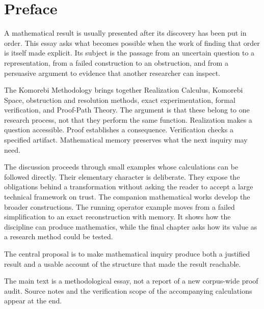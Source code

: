 \documentclass[11pt,oneside]{article}
\newcommand{\deck}[1]{{\small\color{muted}#1\par}}
\begin{document}
\section*{Preface}
A mathematical result is usually presented after its discovery has been put in order. This essay asks what becomes possible when the work of finding that order is itself made explicit. Its subject is the passage from an uncertain question to a representation, from a failed construction to an obstruction, and from a persuasive argument to evidence that another researcher can inspect.

The Komorebi Methodology brings together Realization Calculus, Komorebi Space, obstruction and resolution methods, exact experimentation, formal verification, and Proof-Path Theory. The argument is that these belong to one research process, not that they perform the same function. Realization makes a question accessible. Proof establishes a consequence. Verification checks a specified artifact. Mathematical memory preserves what the next inquiry may need.

The discussion proceeds through small examples whose calculations can be followed directly. Their elementary character is deliberate. They expose the obligations behind a transformation without asking the reader to accept a large technical framework on trust. The companion mathematical works develop the broader constructions. The running operator example moves from a failed simplification to an exact reconstruction with memory. It shows how the discipline can produce mathematics, while the final chapter asks how its value as a research method could be tested.

\vspace{.6em}
\begin{argumentbox}
The central proposal is to make mathematical inquiry produce both a justified result and a usable account of the structure that made the result reachable.
\end{argumentbox}

\vfill
\deck{The main text is a methodological essay, not a report of a new corpus-wide proof audit. Source notes and the verification scope of the accompanying calculations appear at the end.}
\clearpage
\tableofcontents
\clearpage{}

\clearpage

\end{document}
